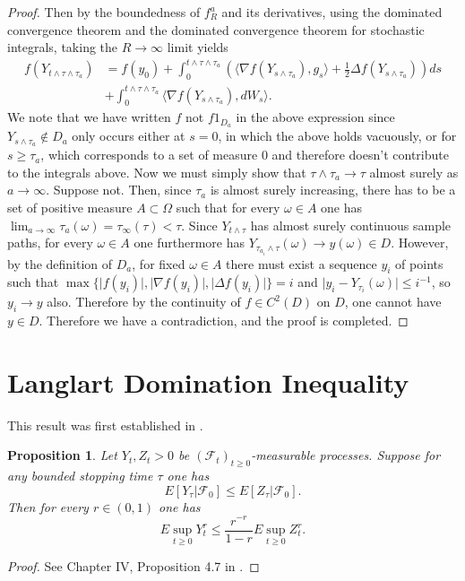 \documentclass{article}
\newtheorem{prop}{Proposition}
\begin{document}
\begin{proof}
    Then by the boundedness of $f^a_R$ and its derivatives, using the dominated convergence theorem and the dominated convergence theorem for stochastic integrals, taking the $R\to\infty$ limit yields
    \begin{align}
        f(Y_{t\wedge\tau\wedge \tau_a})&=  f(y_0)+\int^{t\wedge\tau\wedge \tau_a}_0 (\langle \nabla  f(Y_{s\wedge \tau_a}), g_s\rangle +\frac{1}{2}\Delta  f(Y_{s\wedge \tau_a}))ds\nonumber \\
        &+\int^{t\wedge\tau\wedge \tau_a}_0 \langle \nabla  f(Y_{s\wedge \tau_a}), dW_s\rangle.
    \end{align}
We note that we have written $f$ not $f1_{D_a}$ in the above expression since $Y_{s\wedge \tau_a}\not\in D_a$ only occurs either at $s=0$, in which the above holds vacuously, or for $s\geq \tau_a$, which corresponds to a set of measure $0$ and therefore doesn't contribute to the integrals above. Now we must simply show that $\tau\wedge \tau_a\to\tau$ almost surely as $a\to \infty$. Suppose not. Then, since $\tau_a$ is almost surely increasing, there has to be a set of positive measure $A\subset \Omega$ such that for every $\omega\in A$ one has $\lim_{a\to\infty}\tau_a(\omega)=\tau_\infty(\tau)<\tau$. Since $Y_{t\wedge \tau}$ has almost surely continuous sample paths, for every $\omega \in A$ one furthermore has $Y_{\tau_{a_i}\wedge \tau}(\omega)\to y(\omega)\in D$. However, by the definition of $D_a$, for fixed $\omega\in A$ there must exist a sequence $y_i$ of points such that $\max\{\lvert f(y_i)\rvert,\lvert \nabla f(y_i)\rvert, \lvert \Delta f(y_i)\rvert\}=i$ and $\lvert y_i-Y_{\tau_i}(\omega)\rvert \leq i^{-1}$, so $y_i\to y$ also. Therefore by the continuity of $f\in C^2(D)$ on $D$, one cannot have $y\in D$. Therefore we have a contradiction, and the proof is completed.
\end{proof}
\section{Langlart Domination Inequality}
This result was first established in \cite{Lenglart1977}. 
\begin{prop}\label{prop: Langlart ineq}
    Let $Y_t, Z_t>0$ be $(\mathcal{F}_t)_{t\geq 0}$-measurable processes. Suppose for any bounded stopping time $\tau$ one has
    \begin{equation}
        E[Y_\tau \vert \mathcal{F}_0]\leq  E[Z_\tau \vert \mathcal{F}_0].
    \end{equation}
    Then for every $r\in (0,1)$ one has
    \begin{equation}
        E\sup_{t\geq 0}Y_t^r \leq \frac{r^{-r}}{1-r}E\sup_{t\geq 0}Z_t^r.
    \end{equation}
\end{prop}
\begin{proof}
    See Chapter IV, Proposition 4.7 in \cite{revuz2013continuous}.
\end{proof}
\end{document}
